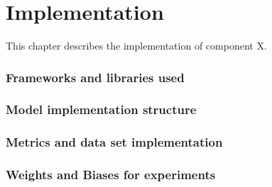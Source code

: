 \chapter{Implementation\label{cha:chapter5}}
This chapter describes the implementation of component X.

\subsection{Frameworks and libraries used}
\subsection{Model implementation structure}
\subsection{Metrics and data set implementation}
\subsection{Weights and Biases for experiments}